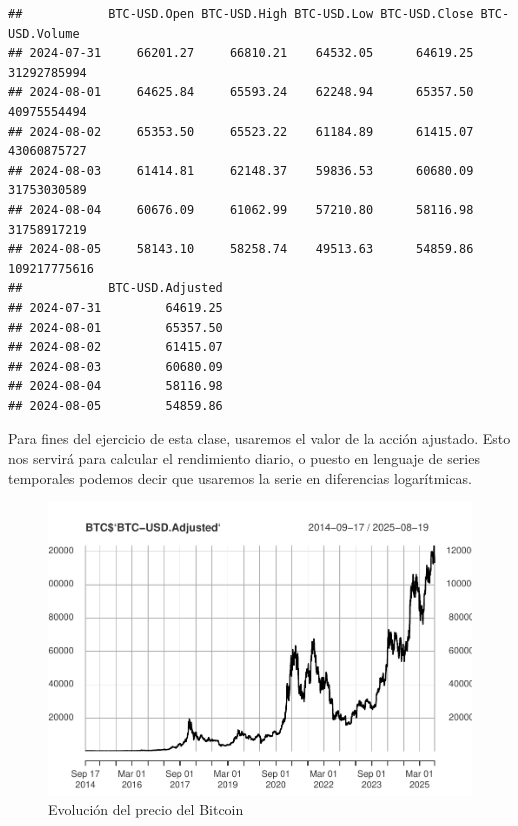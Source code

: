\documentclass[
]{book}
\newenvironment{Shaded}{\begin{snugshade}}{\end{snugshade}}
\newcommand{\AttributeTok}[1]{\textcolor[rgb]{0.13,0.29,0.53}{#1}}
\newcommand{\FunctionTok}[1]{\textcolor[rgb]{0.13,0.29,0.53}{\textbf{#1}}}
\newcommand{\NormalTok}[1]{#1}
\newcommand{\SpecialCharTok}[1]{\textcolor[rgb]{0.81,0.36,0.00}{\textbf{#1}}}
\newcommand{\StringTok}[1]{\textcolor[rgb]{0.31,0.60,0.02}{#1}}
\begin{document}
\begin{verbatim}
##            BTC-USD.Open BTC-USD.High BTC-USD.Low BTC-USD.Close BTC-USD.Volume
## 2024-07-31     66201.27     66810.21    64532.05      64619.25    31292785994
## 2024-08-01     64625.84     65593.24    62248.94      65357.50    40975554494
## 2024-08-02     65353.50     65523.22    61184.89      61415.07    43060875727
## 2024-08-03     61414.81     62148.37    59836.53      60680.09    31753030589
## 2024-08-04     60676.09     61062.99    57210.80      58116.98    31758917219
## 2024-08-05     58143.10     58258.74    49513.63      54859.86   109217775616
##            BTC-USD.Adjusted
## 2024-07-31         64619.25
## 2024-08-01         65357.50
## 2024-08-02         61415.07
## 2024-08-03         60680.09
## 2024-08-04         58116.98
## 2024-08-05         54859.86
\end{verbatim}

Para fines del ejercicio de esta clase, usaremos el valor de la acción ajustado. Esto nos servirá para calcular el rendimiento diario, o puesto en lenguaje de series temporales podemos decir que usaremos la serie en diferencias logarítmicas.

\begin{Shaded}
\end{Shaded}

\begin{figure}

{\centering \includegraphics{Notas-Series-Tiempo_files/figure-latex/fig101-1} 

}

\caption{Evolución del precio del Bitcoin}\label{fig:fig101}
\end{figure}
\end{document}
